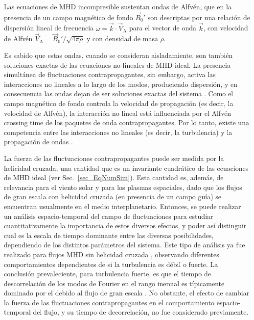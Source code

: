 Las ecuaciones de MHD incompresible sustentan ondas de Alfvén, que en
la presencia de un campo magnético de fondo $\vec{B}_0'$ son
descriptas por una relación de dispersión lineal de frecuencia
$\omega=\vec{k} \cdot \vec{V}_\textrm{A}$ para el vector de onda
$\vec{k}$, con velocidad de Alfvén
$\vec{V}_\textrm{A}=\vec{B}_0'/\sqrt{4\pi \rho}$ y con densidad de
masa $\rho$.

Es sabido que estas ondas, cuando se consideran aisladamiente, son
también soluciones exactas de las ecuaciones no lineales de MHD ideal.
La presencia simultánea de fluctuaciones contrapropagantes, sin
embargo, activa las interacciones no lineales a lo largo de los modos,
produciendo dispersión, y en consecuencia las ondas dejan de ser
soluciones exactas del sistema
\cite{dobrowolny_1980_HydromagneticTurbulence}. Como el campo
magnético de fondo controla la velocidad de propagación (es decir, la
velocidad de Alfvén), la interacción no lineal está influenciada por
el {\color{red} Alfvén crossing time} de los paquetes de onda
contrapropagantes. Por lo tanto, existe una competencia entre las
interacciones no lineales (es decir, la turbulencia) y la propagación
de ondas \cite{dmitruk_waves_2009}.

La fuerza de las fluctuaciones contrapropagantes puede ser medida por
la helicidad cruzada, una cantidad que es un invariante cuadrático de
las ecuaciones de MHD ideal (ver Sec.~\ref{sec_EqNumSim}).  Esta
cantidad es, además, de relevancia para el viento solar y para los
plasmas espaciales, dado que los flujos de gran escala con helicidad
cruzada (en presencia de un campo guía) se encuentran usualmente en el
medio interplanetario. Entonces, se puede realizar un análisis
espacio-temporal del campo de fluctuaciones \cite{servidio_time_2011,
  clark_di_leoni_spatio-temporal_2015} para estudiar cuantitativamente
la importancia de estos diversos efectos, y poder así distinguir cual
es la escala de tiempo dominante entre las diversas posibilidades,
dependiendo de los distintos parámetros del sistema. Este tipo de
análisis ya fue realizado para flujos MHD sin helicidad cruzada
\cite{meyrand_weak_2015, lugones_2016_spatiotemporal,
  meyrand_direct_2016}, observando diferentes comportamientos
dependientes de si la turbulencia es débil o fuerte.  La conclusión
prevaleciente, para turbulencia fuerte, es que el tiempo de
descorrelación de los modos de Fourier en el rango inercial es
típicamente dominado por el \sweeping debido al flujo de gran escala
\cite{servidio_time_2011, chen_sweeping_1989,
  lugones_2016_spatiotemporal}.  No obstante, el efecto de cambiar la
fuerza de las fluctuaciones contrapropagantes en el comportamiento
espacio-temporal del flujo, y su tiempo de decorrelación, no fue
considerado previamente.

